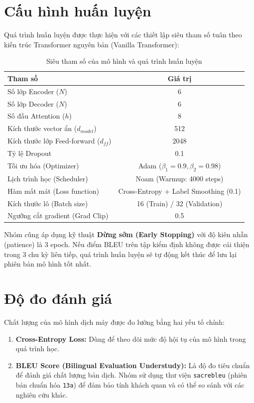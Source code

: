 \documentclass[a4paper,12pt,twoside]{report}
\begin{document}
\section{Cấu hình huấn luyện}
Quá trình huấn luyện được thực hiện với các thiết lập siêu tham số tuân theo kiến trúc Transformer nguyên bản (Vanilla Transformer):

\begin{table}[H]
\centering
\caption{Siêu tham số của mô hình và quá trình huấn luyện}
\label{tab:hyperparams}
\begin{tabular}{|l|c|}
\hline
\textbf{Tham số} & \textbf{Giá trị} \\ \hline
Số lớp Encoder ($N$) & 6 \\ \hline
Số lớp Decoder ($N$) & 6 \\ \hline
Số đầu Attention ($h$) & 8 \\ \hline
Kích thước vector ẩn ($d_{model}$) & 512 \\ \hline
Kích thước lớp Feed-forward ($d_{ff}$) & 2048 \\ \hline
Tỷ lệ Dropout & 0.1 \\ \hline
Tối ưu hóa (Optimizer) & Adam ($\beta_1=0.9, \beta_2=0.98$) \\ \hline
Lịch trình học (Scheduler) & Noam (Warmup: 4000 steps) \\ \hline
Hàm mất mát (Loss function) & Cross-Entropy + Label Smoothing (0.1) \\ \hline
Kích thước lô (Batch size) & 16 (Train) / 32 (Validation) \\ \hline
Ngưỡng cắt gradient (Grad Clip) & 0.5 \\ \hline
\end{tabular}
\end{table}

Nhóm cũng áp dụng kỹ thuật \textbf{Dừng sớm (Early Stopping)} với độ kiên nhẫn (patience) là 3 epoch. Nếu điểm BLEU trên tập kiểm định không được cải thiện trong 3 chu kỳ liên tiếp, quá trình huấn luyện sẽ tự động kết thúc để lưu lại phiên bản mô hình tốt nhất.

\section{Độ đo đánh giá}
Chất lượng của mô hình dịch máy được đo lường bằng hai yếu tố chính:
\begin{enumerate}
    \item \textbf{Cross-Entropy Loss:} Dùng để theo dõi mức độ hội tụ của mô hình trong quá trình học.
    \item \textbf{BLEU Score (Bilingual Evaluation Understudy):} Là độ đo tiêu chuẩn để đánh giá chất lượng bản dịch. Nhóm sử dụng thư viện \texttt{sacrebleu} (phiên bản chuẩn hóa \texttt{13a}) để đảm bảo tính khách quan và có thể so sánh với các nghiên cứu khác.
\end{enumerate}
\end{document}
